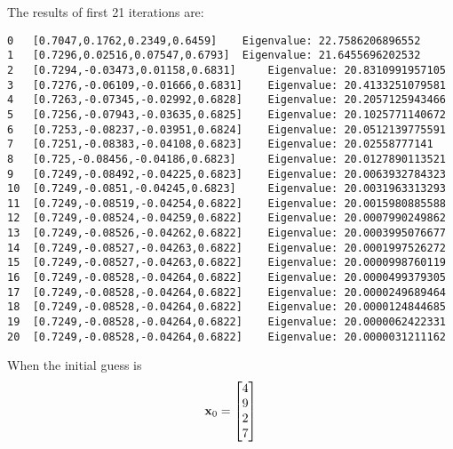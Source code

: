 \documentclass{article}
\begin{document}
\begin{enumerate}
The results of first 21 iterations are: 
\begin{verbatim}
0	[0.7047,0.1762,0.2349,0.6459]	 Eigenvalue: 22.7586206896552
1	[0.7296,0.02516,0.07547,0.6793]	 Eigenvalue: 21.6455696202532
2	[0.7294,-0.03473,0.01158,0.6831]	 Eigenvalue: 20.8310991957105
3	[0.7276,-0.06109,-0.01666,0.6831]	 Eigenvalue: 20.4133251079581
4	[0.7263,-0.07345,-0.02992,0.6828]	 Eigenvalue: 20.2057125943466
5	[0.7256,-0.07943,-0.03635,0.6825]	 Eigenvalue: 20.1025771140672
6	[0.7253,-0.08237,-0.03951,0.6824]	 Eigenvalue: 20.0512139775591
7	[0.7251,-0.08383,-0.04108,0.6823]	 Eigenvalue: 20.02558777141
8	[0.725,-0.08456,-0.04186,0.6823]	 Eigenvalue: 20.0127890113521
9	[0.7249,-0.08492,-0.04225,0.6823]	 Eigenvalue: 20.0063932784323
10	[0.7249,-0.0851,-0.04245,0.6823]	 Eigenvalue: 20.0031963313293
11	[0.7249,-0.08519,-0.04254,0.6822]	 Eigenvalue: 20.0015980885588
12	[0.7249,-0.08524,-0.04259,0.6822]	 Eigenvalue: 20.0007990249862
13	[0.7249,-0.08526,-0.04262,0.6822]	 Eigenvalue: 20.0003995076677
14	[0.7249,-0.08527,-0.04263,0.6822]	 Eigenvalue: 20.0001997526272
15	[0.7249,-0.08527,-0.04263,0.6822]	 Eigenvalue: 20.0000998760119
16	[0.7249,-0.08528,-0.04264,0.6822]	 Eigenvalue: 20.0000499379305
17	[0.7249,-0.08528,-0.04264,0.6822]	 Eigenvalue: 20.0000249689464
18	[0.7249,-0.08528,-0.04264,0.6822]	 Eigenvalue: 20.0000124844685
19	[0.7249,-0.08528,-0.04264,0.6822]	 Eigenvalue: 20.0000062422331
20	[0.7249,-0.08528,-0.04264,0.6822]	 Eigenvalue: 20.0000031211162
\end{verbatim}
\end{enumerate}

When the initial guess is 
\begin{align}
\boldsymbol{\mathrm{x}}_0=\begin{bmatrix} 4 \\ 9 \\ 2\\ 7 \end{bmatrix}
\end{align}
\end{document}
